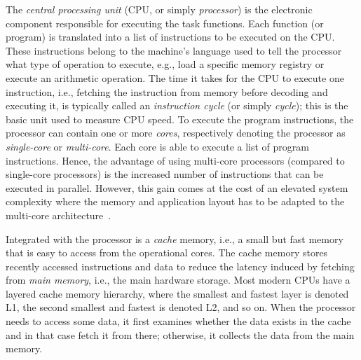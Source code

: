 The \emph{central processing unit} (CPU, or simply \emph{processor}) is the electronic component responsible for executing the task functions.
Each function (or program) is translated into a list of instructions to be executed on the CPU.
These instructions belong to the machine's language used to tell the processor what type of operation to execute, e.g., load a specific memory registry or execute an arithmetic operation.
The time it takes for the CPU to execute one instruction, i.e., fetching the instruction from memory before decoding and executing it, is typically called an \emph{instruction cycle} (or simply \emph{cycle}); this is the basic unit used to measure CPU speed.
To execute the program instructions, the processor can contain one or more \emph{cores}, respectively denoting the processor as \emph{single-core} or \emph{multi-core}.
Each core is able to execute a list of program instructions.
Hence, the advantage of using multi-core processors (compared to single-core processors) is the increased number of instructions that can be executed in parallel. 
However, this gain comes at the cost of an elevated system complexity where the memory and application layout has to be adapted to the multi-core architecture~\cite{Brandenburg:2011}.

Integrated with the processor is a \emph{cache} memory, i.e., a small but fast memory that is easy to access from the operational cores.
The cache memory stores recently accessed instructions and data to reduce the latency induced by fetching from \emph{main memory}, i.e., the main hardware storage.
Most modern CPUs have a layered cache memory hierarchy, where the smallest and fastest layer is denoted L1, the second smallest and fastest is denoted L2, and so on.
When the processor needs to access some data, it first examines whether the data exists in the cache and in that case fetch it from there; otherwise, it collects the data from the main memory.

